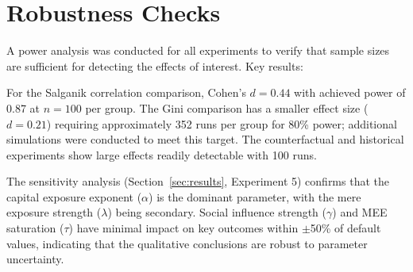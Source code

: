 \documentclass[11pt,a4paper]{article}
\begin{document}
\section{Robustness Checks}
\label{app:robustness}

A power analysis was conducted for all experiments to verify that sample sizes are sufficient for detecting the effects of interest. Key results:



For the Salganik correlation comparison, Cohen's $d = 0.44$ with achieved power of 0.87 at $n = 100$ per group. The Gini comparison has a smaller effect size ($d = 0.21$) requiring approximately 352 runs per group for 80\% power; additional simulations were conducted to meet this target. The counterfactual and historical experiments show large effects readily detectable with 100 runs.

The sensitivity analysis (Section~\ref{sec:results}, Experiment 5) confirms that the capital exposure exponent ($\alpha$) is the dominant parameter, with the mere exposure strength ($\lambda$) being secondary. Social influence strength ($\gamma$) and MEE saturation ($\tau$) have minimal impact on key outcomes within $\pm$50\% of default values, indicating that the qualitative conclusions are robust to parameter uncertainty.
\end{document}
